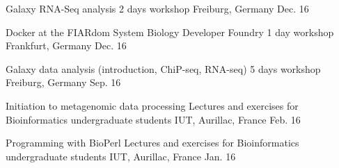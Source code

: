 
\begin{cvhonors}

  \cvhonor
    {Galaxy RNA-Seq analysis} %
    {2 days workshop} %
    {Freiburg, Germany} %
    {Dec. 16} %

  \cvhonor
    {Docker at the FIARdom System Biology Developer Foundry} %
    {1 day workshop} %
    {Frankfurt, Germany} %
    {Dec. 16} %

  \cvhonor
    {Galaxy data analysis (introduction, ChiP-seq, RNA-seq)} %
    {5 days workshop} %
    {Freiburg, Germany} %
    {Sep. 16} %

  \cvhonor
    {Initiation to metagenomic data processing } %
    {Lectures and exercises for Bioinformatics undergraduate students} %
    {IUT, Aurillac, France} %
    {Feb. 16} %

  \cvhonor
    {Programming with BioPerl} %
    {Lectures and exercises for Bioinformatics undergraduate students} %
    {IUT, Aurillac, France} %
    {Jan. 16} %

\end{cvhonors}


